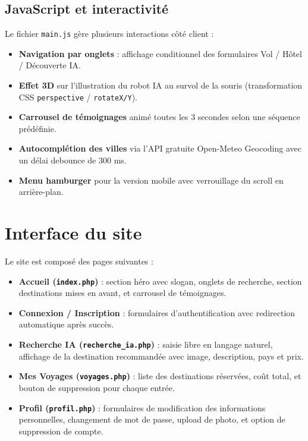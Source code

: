 \documentclass[a4paper,12pt]{article}
\begin{document}
\subsection{JavaScript et interactivité}

Le fichier \texttt{main.js} gère plusieurs interactions côté client :

\begin{itemize}
  \item \textbf{Navigation par onglets} : affichage conditionnel des formulaires Vol / Hôtel / Découverte IA.
  \item \textbf{Effet 3D} sur l'illustration du robot IA au survol de la souris (transformation CSS \texttt{perspective} / \texttt{rotateX/Y}).
  \item \textbf{Carrousel de témoignages} animé toutes les 3 secondes selon une séquence prédéfinie.
  \item \textbf{Autocomplétion des villes} via l'API gratuite Open-Meteo Geocoding avec un délai debounce de 300 ms.
  \item \textbf{Menu hamburger} pour la version mobile avec verrouillage du scroll en arrière-plan.
\end{itemize}

\section{Interface du site}

Le site est composé des pages suivantes :

\begin{itemize}
  \item \textbf{Accueil (\texttt{index.php})} : section héro avec slogan, onglets de recherche, section destinations mises en avant, et carrousel de témoignages.
  \item \textbf{Connexion / Inscription} : formulaires d'authentification avec redirection automatique après succès.
  \item \textbf{Recherche IA (\texttt{recherche\_ia.php})} : saisie libre en langage naturel, affichage de la destination recommandée avec image, description, pays et prix.
  \item \textbf{Mes Voyages (\texttt{voyages.php})} : liste des destinations réservées, coût total, et bouton de suppression pour chaque entrée.
  \item \textbf{Profil (\texttt{profil.php})} : formulaires de modification des informations personnelles, changement de mot de passe, upload de photo, et option de suppression de compte.
\end{itemize}
\end{document}
